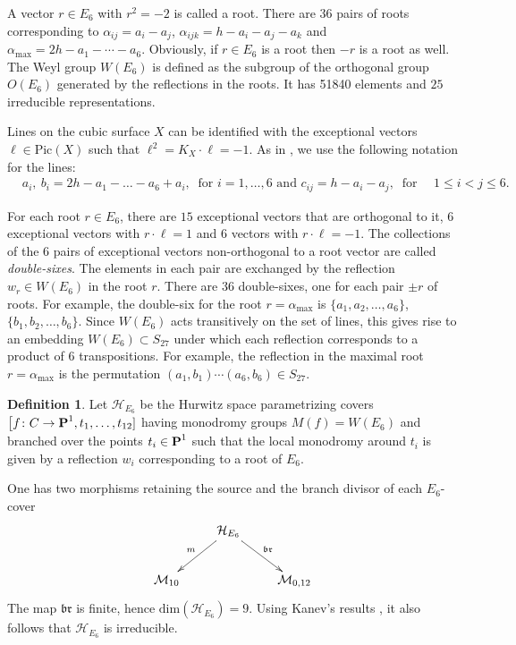 \documentclass[11pt]{amsart}
\theoremstyle{definition}
\newtheorem{definition}[theorem]{Definition}
\def\PP{{\textbf P}}
\def\cM{\mathcal{M}}
\def\cH{\mathcal{H}}
\begin{document}
\vskip 4pt

A vector  $r\in E_6$ with $r^2=-2$ is called a root. There are $36$ pairs of roots corresponding to
$\alpha_{ij}=a_i-a_j$, $\alpha_{ijk}=h-a_i-a_j-a_k$ and
$\alpha_{\max}=2h -a_1-\cdots -a_6$. Obviously, if $r\in E_6$ is a root then $-r$ is a root as well.  The Weyl group $W(E_6)$ is defined as the subgroup of the orthogonal group $O(E_6)$  generated by the reflections in the
roots. It has 51840 elements and $25$ irreducible representations.

\vskip 4pt

Lines on the cubic surface $X$ can  be identified with the exceptional vectors $\ell\in \mbox{Pic}(X)$ such that
$\ell^2=K_X\cdot \ell=-1$. As in \cite{Dol}, we use the following notation for the lines:
\begin{align*}
  &a_i,\ b_i = 2h-a_1-\dots-a_6+a_i, \ \mbox{ for } i=1, \ldots, 6 \mbox{ and } 
  c_{ij}= h-a_i-a_j, \  \mbox{ for } \quad 1\le i<j \le 6.
\end{align*}

For each root $r\in E_6$, there are $15$ exceptional vectors that are
orthogonal to it, $6$ exceptional vectors with $r\cdot \ell=1$ and $6$ vectors with
$r\cdot \ell=-1$. The collections of the $6$ pairs of exceptional vectors
non-orthogonal to a root vector are called \emph{double-sixes}. The
elements in each pair are exchanged by the reflection $w_r\in W(E_6)$ in the
root $r$. There are $36$ double-sixes, one for each pair $\pm r$ of roots. For example, the double-six for the root $r=\alpha_{\max}$ is
$\{a_1,a_2,\dotsc,a_6\}$, $\{b_1,b_2,\dotsc,b_6\}$. Since $W(E_6)$ acts transitively on the set of lines, this gives rise to an embedding $W(E_6)\subset S_{27}$ under which
 each reflection corresponds to a product of 6
transpositions. For example, the reflection in the maximal root
$r=\alpha_{\max}$ is the permutation $(a_1, b_1)\cdots (a_6, b_6)\in S_{27}$.

\begin{definition}\label{def:hurw}
Let $\cH_{E_6}$ be the Hurwitz space parametrizing covers $\bigl[f\colon C\rightarrow \PP^1, t_1, \ldots, t_{12}]$ having monodromy groups $M(f)=W(E_6)$ and branched over the points $t_i\in \PP^1$ such that the local monodromy around $t_i$ is given by a reflection $w_i$ corresponding to a root of $E_6$.
\end{definition}
One has two morphisms retaining the source and the branch divisor of each $E_6$-cover 
\begin{equation}\label{eq:br+m}
\xymatrix{
  & \cH_{E_6}
   \ar[dl]_{m} \ar[dr]^{\mathfrak{br}} & \\
   \cM_{10} & & \cM_{0,12}       \\
                 }
\end{equation}
The map $\mathfrak{br}$ is finite, hence $\mbox{dim}(\cH_{E_6})=9$. Using Kanev's results \cite{K2}, it also follows that $\cH_{E_6}$ is irreducible.
\end{document}
